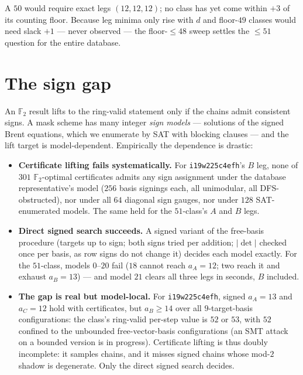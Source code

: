 \documentclass[11pt]{article}
\theoremstyle{definition}
\theoremstyle{remark}
\newcommand{\F}{\mathbb{F}}
\begin{document}
A $50$ would require exact legs $(12,12,12)$; no class has yet come
within $+3$ of its counting floor.  Because leg minima only rise with
$d$ and floor-$49$ classes would need slack $+1$ --- never observed
--- the floor-$\le48$ sweep settles the $\le51$ question for the
entire database.

\section{The sign gap}\label{sec:signs}

An $\F_2$ result lifts to the ring-valid statement only if the
chains admit consistent signs.  A mask scheme has many integer
\emph{sign models} --- solutions of the signed Brent equations, which
we enumerate by SAT with blocking clauses --- and the lift target is
model-dependent.  Empirically the dependence is drastic:

\begin{itemize}
\item \textbf{Certificate lifting fails systematically.}  For
  \texttt{i19w225c4efh}'s $B$ leg, none of $301$ $\F_2$-optimal
  certificates admits any sign assignment under the database
  representative's model ($256$ basis signings each, all unimodular,
  all DFS-obstructed), nor under all $64$ diagonal sign gauges, nor
  under $128$ SAT-enumerated models.  The same held for the
  $51$-class's $A$ and $B$ legs.
\item \textbf{Direct signed search succeeds.}  A signed variant of the
  free-basis procedure (targets up to sign; both signs tried per
  addition; $|\det|$ checked once per basis, as row signs do not
  change it) decides each model exactly.  For the $51$-class, models
  $0$--$20$ fail ($18$ cannot reach $a_A=12$; two reach it and
  exhaust $a_B=13$) --- and model $21$ clears all three legs in
  seconds, $B$ included.
\item \textbf{The gap is real but model-local.}  For
  \texttt{i19w225c4efh}, signed $a_A=13$ and $a_C=12$ hold with
  certificates, but $a_B\ge14$ over all $9$-target-basis
  configurations: the class's ring-valid per-step value is $52$ or
  $53$, with $52$ confined to the unbounded free-vector-basis
  configurations (an SMT attack on a bounded version is in progress).
  Certificate lifting is thus doubly incomplete: it samples chains,
  and it misses signed chains whose mod-$2$ shadow is degenerate.
  Only the direct signed search decides.
\end{itemize}
\end{document}
